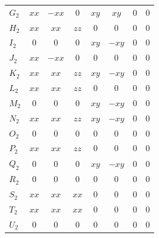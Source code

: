 \documentclass[a4paper,11pt]{article}
\begin{document}
\begin{landscape}
{\begin{minipage}[t]{0.60\textwidth}
\begin{tabular}{@{}l c c c c c c c@{}}
$G_2$ & $xx$ & $-xx$ & $0$ & $xy$ & $xy$ & $0$ & $0$ \\
$H_2$ & $xx$ & $xx$ & $zz$ & $0$ & $0$ & $0$ & $0$ \\
$I_2$ & $0$ & $0$ & $0$ & $xy$ & $-xy$ & $0$ & $0$ \\
$J_2$ & $xx$ & $-xx$ & $0$ & $0$ & $0$ & $0$ & $0$ \\
$K_2$ & $xx$ & $xx$ & $zz$ & $xy$ & $-xy$ & $0$ & $0$ \\
$L_2$ & $xx$ & $xx$ & $zz$ & $0$ & $0$ & $0$ & $0$ \\
$M_2$ & $0$ & $0$ & $0$ & $xy$ & $-xy$ & $0$ & $0$ \\
$N_2$ & $xx$ & $xx$ & $zz$ & $xy$ & $-xy$ & $0$ & $0$ \\
$O_2$ & $0$ & $0$ & $0$ & $0$ & $0$ & $0$ & $0$ \\
$P_2$ & $xx$ & $xx$ & $zz$ & $0$ & $0$ & $0$ & $0$ \\
$Q_2$ & $0$ & $0$ & $0$ & $xy$ & $-xy$ & $0$ & $0$ \\
$R_2$ & $0$ & $0$ & $0$ & $0$ & $0$ & $0$ & $0$ \\
$S_2$ & $xx$ & $xx$ & $xx$ & $0$ & $0$ & $0$ & $0$ \\
$T_2$ & $xx$ & $xx$ & $xx$ & $0$ & $0$ & $0$ & $0$ \\
$U_2$ & $0$ & $0$ & $0$ & $0$ & $0$ & $0$ & $0$ \\
\bottomrule
\end{tabular}
\end{minipage}
}
\end{landscape}
\end{document}
